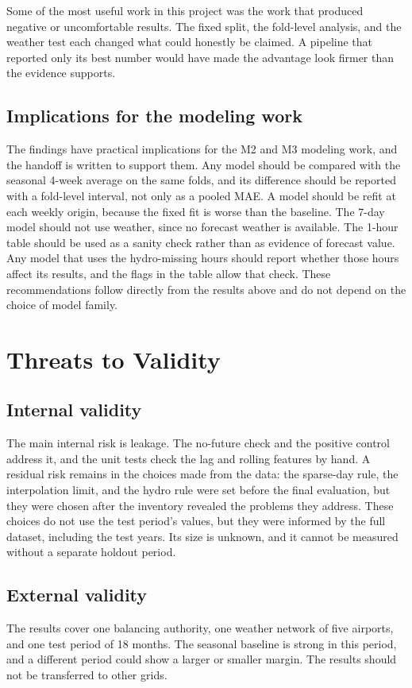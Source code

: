 \documentclass[10pt,journal,compsoc]{IEEEtran}
\begin{document}
Some of the most useful work in this project was the work that produced negative or uncomfortable results. The fixed split, the fold-level analysis, and the weather test each changed what could honestly be claimed. A pipeline that reported only its best number would have made the advantage look firmer than the evidence supports.

\subsection{Implications for the modeling work}
The findings have practical implications for the M2 and M3 modeling work, and the handoff is written to support them. Any model should be compared with the seasonal 4-week average on the same folds, and its difference should be reported with a fold-level interval, not only as a pooled MAE. A model should be refit at each weekly origin, because the fixed fit is worse than the baseline. The 7-day model should not use weather, since no forecast weather is available. The 1-hour table should be used as a sanity check rather than as evidence of forecast value. Any model that uses the hydro-missing hours should report whether those hours affect its results, and the flags in the table allow that check. These recommendations follow directly from the results above and do not depend on the choice of model family.

\section{Threats to Validity}
\label{sec:threats}

\subsection{Internal validity}
The main internal risk is leakage. The no-future check and the positive control address it, and the unit tests check the lag and rolling features by hand. A residual risk remains in the choices made from the data: the sparse-day rule, the interpolation limit, and the hydro rule were set before the final evaluation, but they were chosen after the inventory revealed the problems they address. These choices do not use the test period's values, but they were informed by the full dataset, including the test years. Its size is unknown, and it cannot be measured without a separate holdout period.

\subsection{External validity}
The results cover one balancing authority, one weather network of five airports, and one test period of 18 months. The seasonal baseline is strong in this period, and a different period could show a larger or smaller margin. The results should not be transferred to other grids.
\end{document}
